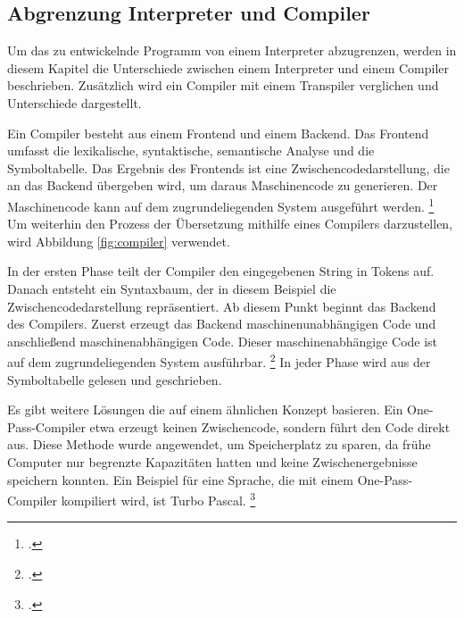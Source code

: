  
    \pagebreak

\subsection{Abgrenzung Interpreter und Compiler}
Um das zu entwickelnde Programm von einem Interpreter abzugrenzen, werden in diesem Kapitel die Unterschiede zwischen einem Interpreter und einem Compiler beschrieben. Zusätzlich wird ein Compiler mit einem Transpiler verglichen und Unterschiede dargestellt.
  
Ein Compiler besteht aus einem Frontend und einem Backend. Das Frontend umfasst die lexikalische, syntaktische, semantische Analyse und die Symboltabelle.
Das Ergebnis des Frontends ist eine Zwischencodedarstellung, die an das Backend übergeben wird, um daraus Maschinencode zu generieren. Der Maschinencode kann auf dem zugrundeliegenden System ausgeführt werden. \footcite[Vgl. ][S.106ff. ]{aho}
Um weiterhin den Prozess der Übersetzung mithilfe eines Compilers darzustellen, wird Abbildung \ref{fig:compiler} verwendet.

In der ersten Phase teilt der Compiler den eingegebenen String in Tokens auf. Danach entsteht ein Syntaxbaum, der in diesem Beispiel die Zwischencodedarstellung repräsentiert. Ab diesem Punkt beginnt das Backend des Compilers. Zuerst erzeugt das Backend maschinenunabhängigen Code und anschließend maschinenabhängigen Code. Dieser maschinenabhängige Code ist auf dem zugrundeliegenden System ausführbar. \footcite[Vgl. ][S.30 ]{aho}
In jeder Phase wird aus der Symboltabelle gelesen und geschrieben.

Es gibt weitere Lösungen die auf einem ähnlichen Konzept basieren.
Ein One-Pass-Compiler etwa erzeugt keinen Zwischencode, sondern führt den Code direkt aus. Diese Methode wurde angewendet, um Speicherplatz zu sparen, da frühe Computer nur begrenzte Kapazitäten hatten und keine Zwischenergebnisse speichern konnten. Ein Beispiel für eine Sprache, die mit einem One-Pass-Compiler kompiliert wird, ist Turbo Pascal. \footcite[Vgl. ][]{onepass}

